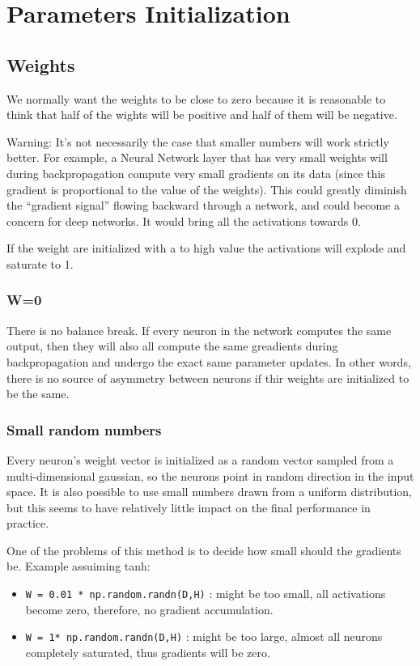 \chapter{Parameters Initialization}

\section{Weights}
We normally want the weights to be close to zero because it is reasonable to think that half of the wights will be positive and half of them will be negative.

Warning: It’s not necessarily the case that smaller numbers will work strictly better. For example, a Neural Network layer that has very small weights will during backpropagation compute very small gradients on its data (since this gradient is proportional to the value of the weights). This could greatly diminish the “gradient signal” flowing backward through a network, and could become a concern for deep networks. It would bring all the activations towards 0.

If the weight are initialized with a to high value the activations will explode and saturate to 1.

\subsection*{W=0}
There is no balance break. If every neuron in the network computes the same output, then they will also all compute the same greadients during backpropagation and undergo the exact same parameter updates. In other words, there is no source of asymmetry between neurons if thir weights are initialized to be the same.

\subsection*{Small random numbers}
Every neuron’s weight vector is initialized as a random vector sampled from a multi-dimensional gaussian, so the neurons point in random direction in the input space. It is also possible to use small numbers drawn from a uniform distribution, but this seems to have relatively little impact on the final performance in practice.

One of the problems of this method is to decide how small should the gradients be. Example assuiming tanh:
\begin{itemize}
\item \texttt{W = 0.01 * np.random.randn(D,H)} : might be too small, all activations become zero, therefore, no gradient accumulation.
\item \texttt{W = 1* np.random.randn(D,H)} : might be too large, almost all neurons completely saturated, thus gradients will be zero.
\end{itemize}

